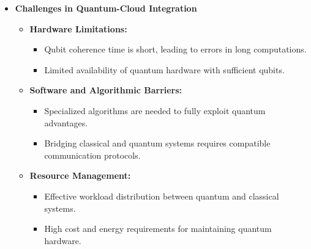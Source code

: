 \documentclass[12pt,a4paper]{article}
\begin{document}
\begin{itemize}
    \item \textbf{Challenges in Quantum-Cloud Integration}
    \begin{itemize}
        \item \textbf{Hardware Limitations:}
        \begin{itemize}
            \item Qubit coherence time is short, leading to errors in long computations.
            \item Limited availability of quantum hardware with sufficient qubits.
        \end{itemize}
        \item \textbf{Software and Algorithmic Barriers:}
        \begin{itemize}
            \item Specialized algorithms are needed to fully exploit quantum advantages.
            \item Bridging classical and quantum systems requires compatible communication protocols.
        \end{itemize}
        \item \textbf{Resource Management:}
        \begin{itemize}
            \item Effective workload distribution between quantum and classical systems.
            \item High cost and energy requirements for maintaining quantum hardware.
        \end{itemize}
    \end{itemize}


\end{itemize}
\end{document}
